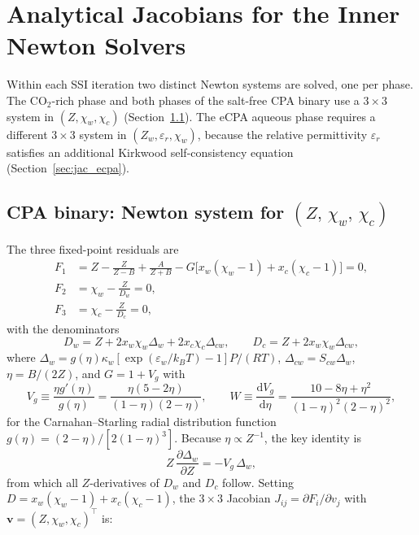 \documentclass[preprint,12pt,authoryear]{elsarticle}
\begin{document}
\section{Analytical Jacobians for the Inner Newton Solvers}
\label{sec:jacobians}

Within each SSI iteration two distinct Newton systems are solved, one per phase.
The CO$_2$-rich phase and both phases of the salt-free CPA binary use a
$3\times 3$ system in $(Z,\chi_w,\chi_c)$ (Section~\ref{sec:jac_cpa}).
The eCPA aqueous phase requires a different $3\times 3$ system in
$(Z_w,\varepsilon_r,\chi_w)$, because the relative permittivity $\varepsilon_r$
satisfies an additional Kirkwood self-consistency equation
(Section~\ref{sec:jac_ecpa}).

\subsection{CPA binary: Newton system for $(Z,\,\chi_w,\,\chi_c)$}
\label{sec:jac_cpa}

The three fixed-point residuals are
\begin{align}
  F_1 &= Z - \frac{Z}{Z-B} + \frac{A}{Z+B}
         - G\bigl[x_w(\chi_w-1)+x_c(\chi_c-1)\bigr] = 0,
         \label{eq:F1jac} \\
  F_2 &= \chi_w - \frac{Z}{D_w} = 0,
         \label{eq:F2jac} \\
  F_3 &= \chi_c - \frac{Z}{D_c} = 0,
         \label{eq:F3jac}
\end{align}
with the denominators
\begin{equation}
  D_w = Z + 2x_w\chi_w\Delta_w + 2x_c\chi_c\Delta_{cw}, \qquad
  D_c = Z + 2x_w\chi_w\Delta_{cw},
  \label{eq:DwDc}
\end{equation}
where $\Delta_w = g(\eta)\kappa_w[\exp(\varepsilon_w/k_BT)-1]P/(RT)$,
$\Delta_{cw} = S_{cw}\Delta_w$, $\eta = B/(2Z)$,
and $G = 1 + V_g$ with
\begin{equation}
  V_g \equiv \frac{\eta g'(\eta)}{g(\eta)} = \frac{\eta(5-2\eta)}{(1-\eta)(2-\eta)}, \qquad
  W  \equiv \frac{\mathrm{d}V_g}{\mathrm{d}\eta} = \frac{10-8\eta+\eta^2}{(1-\eta)^2(2-\eta)^2},
  \label{eq:VgW}
\end{equation}
for the Carnahan--Starling radial distribution function
$g(\eta) = (2-\eta)/[2(1-\eta)^3]$.
Because $\eta \propto Z^{-1}$, the key identity is
\begin{equation}
  Z\,\frac{\partial\Delta_w}{\partial Z} = -V_g\,\Delta_w,
  \label{eq:dDeltadZ}
\end{equation}
from which all $Z$-derivatives of $D_w$ and $D_c$ follow.
Setting $D = x_w(\chi_w-1)+x_c(\chi_c-1)$, the $3\times 3$ Jacobian
$J_{ij} = \partial F_i/\partial v_j$ with $\mathbf{v}=(Z,\chi_w,\chi_c)^\top$ is:
\end{document}
